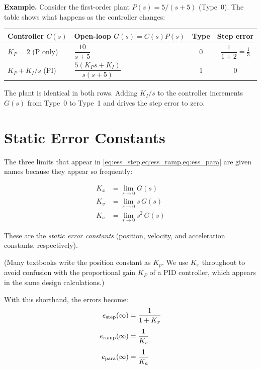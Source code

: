 \documentclass[../../book.tex]{subfiles}
\begin{document}
\textbf{Example.}  Consider the first-order plant $P(s) = 5/(s+5)$ (Type~0).
The table shows what happens as the controller changes:

\begin{center}
\begin{tabular}{llcc}
\toprule
Controller $C(s)$ & Open-loop $G(s) = C(s)P(s)$ & Type & Step error \\
\midrule
$K_P = 2$ (P only) & $\dfrac{10}{s+5}$                 & 0 & $\dfrac{1}{1+2} = \tfrac{1}{3}$ \\[9pt]
$K_P + K_I/s$ (PI) & $\dfrac{5(K_P s + K_I)}{s(s+5)}$ & 1 & $0$ \\[9pt]
\bottomrule
\end{tabular}
\end{center}

The plant is identical in both rows.  Adding $K_I/s$ to the controller increments
$G(s)$ from Type~0 to Type~1 and drives the step error to zero.

\section{Static Error Constants}
\label{sec:error_constants}

The three limits that appear in \cref{eq:ess_step,eq:ess_ramp,eq:ess_para} are
given names because they appear so frequently:

\begin{align}
  K_x &= \lim_{s \to 0} G(s)         \label{eq:Kx} \\[4pt]
  K_v &= \lim_{s \to 0} s\,G(s)      \label{eq:Kv} \\[4pt]
  K_a &= \lim_{s \to 0} s^2\,G(s)    \label{eq:Ka}
\end{align}

These are the \emph{static error constants} (position, velocity, and
acceleration constants, respectively).

(Many textbooks write the position constant as $K_p$.  We
use $K_x$ throughout to avoid confusion with the proportional gain $K_P$
of a PID controller, which appears in the same design calculations.)

With this shorthand, the errors become:
\begin{align}
  e_{\rm step}(\infty) &= \frac{1}{1 + K_x} \label{eq:ess_Kx} \\[4pt]
  e_{\rm ramp}(\infty) &= \frac{1}{K_v}     \label{eq:ess_Kv} \\[4pt]
  e_{\rm para}(\infty) &= \frac{1}{K_a}     \label{eq:ess_Ka}
\end{align}
\end{document}
